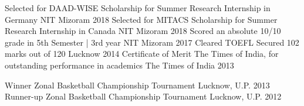 \begin{cvhonors}
  \cvhonor
    {Selected for DAAD-WISE Scholarship }
    {for Summer Research Internship in Germany}
    {NIT Mizoram}
    {2018}
  \cvhonor
    {Selected for MITACS Scholarship }
    {for Summer Research Internship in Canada}
    {NIT Mizoram}
    {2018}
  \cvhonor
    {Scored an absolute 10/10 grade }
    {in 5th Semester | 3rd year}
    {NIT Mizoram}
    {2017}
  \cvhonor
    {Cleared TOEFL}
    {Secured 102 marks out of 120}
    {Lucknow}
    {2014}
  \cvhonor
    {Certificate of Merit}
    {The Times of India, for outstanding performance in academics}
    {The Times of India}
    {2013}
\end{cvhonors}

\begin{cvhonors}
  \cvhonor
    {Winner}
    {Zonal Basketball Championship Tournament}
    {Lucknow, U.P.}
    {2013}
  \cvhonor
    {Runner-up}
    {Zonal Basketball Championship Tournament}
    {Lucknow, U.P.}
    {2012}
\end{cvhonors}